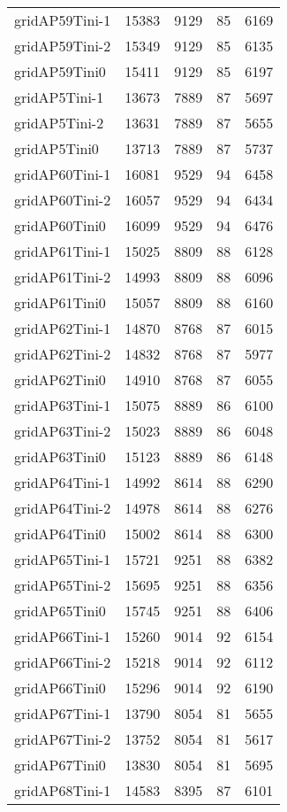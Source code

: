 \begin{longtable}{lrrrr}
gridAP59Tini-1 & 15383 & 9129 & 85 & 6169 \\
gridAP59Tini-2 & 15349 & 9129 & 85 & 6135 \\
gridAP59Tini0 & 15411 & 9129 & 85 & 6197 \\
gridAP5Tini-1 & 13673 & 7889 & 87 & 5697 \\
gridAP5Tini-2 & 13631 & 7889 & 87 & 5655 \\
gridAP5Tini0 & 13713 & 7889 & 87 & 5737 \\
gridAP60Tini-1 & 16081 & 9529 & 94 & 6458 \\
gridAP60Tini-2 & 16057 & 9529 & 94 & 6434 \\
gridAP60Tini0 & 16099 & 9529 & 94 & 6476 \\
gridAP61Tini-1 & 15025 & 8809 & 88 & 6128 \\
gridAP61Tini-2 & 14993 & 8809 & 88 & 6096 \\
gridAP61Tini0 & 15057 & 8809 & 88 & 6160 \\
gridAP62Tini-1 & 14870 & 8768 & 87 & 6015 \\
gridAP62Tini-2 & 14832 & 8768 & 87 & 5977 \\
gridAP62Tini0 & 14910 & 8768 & 87 & 6055 \\
gridAP63Tini-1 & 15075 & 8889 & 86 & 6100 \\
gridAP63Tini-2 & 15023 & 8889 & 86 & 6048 \\
gridAP63Tini0 & 15123 & 8889 & 86 & 6148 \\
gridAP64Tini-1 & 14992 & 8614 & 88 & 6290 \\
gridAP64Tini-2 & 14978 & 8614 & 88 & 6276 \\
gridAP64Tini0 & 15002 & 8614 & 88 & 6300 \\
gridAP65Tini-1 & 15721 & 9251 & 88 & 6382 \\
gridAP65Tini-2 & 15695 & 9251 & 88 & 6356 \\
gridAP65Tini0 & 15745 & 9251 & 88 & 6406 \\
gridAP66Tini-1 & 15260 & 9014 & 92 & 6154 \\
gridAP66Tini-2 & 15218 & 9014 & 92 & 6112 \\
gridAP66Tini0 & 15296 & 9014 & 92 & 6190 \\
gridAP67Tini-1 & 13790 & 8054 & 81 & 5655 \\
gridAP67Tini-2 & 13752 & 8054 & 81 & 5617 \\
gridAP67Tini0 & 13830 & 8054 & 81 & 5695 \\
gridAP68Tini-1 & 14583 & 8395 & 87 & 6101 \\

\end{longtable}
